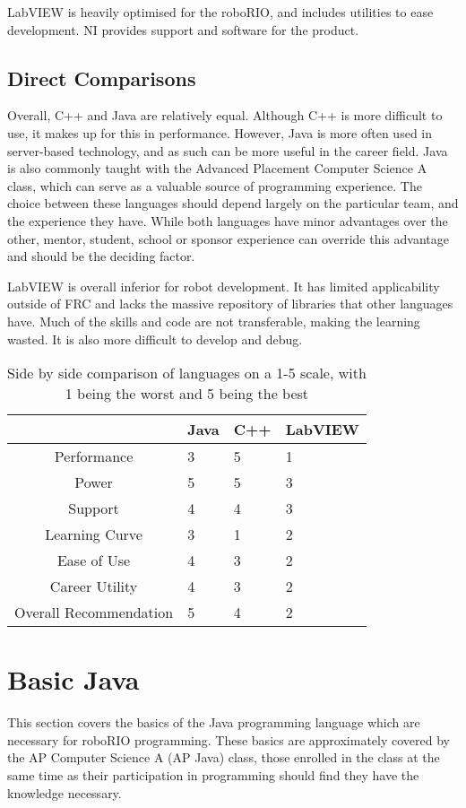 \documentclass[]{report}
\begin{document}
LabVIEW is heavily optimised for the roboRIO, and includes utilities to ease development.
NI provides support and software for the product.

\subsection{Direct Comparisons}

Overall, C++ and Java are relatively equal.
Although C++ is more difficult to use, it makes up for this in performance.
However, Java is more often used in server-based technology, and as such can be more useful in the career field.
Java is also commonly taught with the Advanced Placement Computer Science A class, which can serve as a valuable source of programming experience.
The choice between these languages should depend largely on the particular team, and the experience they have.
While both languages have minor advantages over the other, mentor, student, school or sponsor experience can override this advantage and should be the deciding factor.

LabVIEW is overall inferior for robot development.
It has limited applicability outside of FRC and lacks the massive repository of libraries that other languages have.
Much of the skills and code are not transferable, making the learning wasted.
It is also more difficult to develop and debug.

\begin{table}[h!]
	\begin{tabular}{c|l|l|l|}
		& Java & C++ & LabVIEW \\ \hline \hline
		Performance & 3 & 5 & 1 \\ \hline
		Power & 5 & 5 & 3 \\ \hline
		Support & 4 & 4 & 3 \\ \hline
		Learning Curve & 3 & 1 & 2 \\ \hline
		Ease of Use & 4 & 3 & 2 \\ \hline
		Career Utility & 4 & 3 & 2 \\ \hline
		Overall Recommendation & 5 & 4 & 2 \\ \hline
	\end{tabular}
	\caption{Side by side comparison of languages on a 1-5 scale, with 1 being the worst and 5 being the best}
\end{table}

\section{Basic Java}
This section covers the basics of the Java programming language which are necessary for roboRIO programming.
These basics are approximately covered by the AP Computer Science A (AP Java) class, those enrolled in the class at the same time as their participation in programming should find they have the knowledge necessary.
\end{document}
